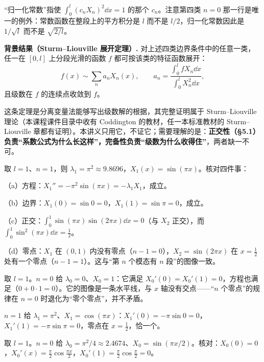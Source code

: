 \documentclass[11pt]{ctexart}
\let\orighdr\hdr
\renewcommand{\hdr}[2]{\needspace{12\baselineskip}\orighdr{#1}{#2}}
\let\origsubhdr\subhdr
\renewcommand{\subhdr}[1]{\needspace{3\baselineskip}\origsubhdr{#1}}
\begin{document}
“归一化常数”指使 $\int_0^l(c_nX_n)^2\dd x=1$ 的那个 $c_n$。注意第四类 $n=0$ 那一行是唯一的例外：常数函数在整段上的平方积分是 $l$ 而不是 $l/2$，归一化常数因此是 $1/\sqrt l$ 而不是 $\sqrt{2/l}$。


\textbf{背景结果（Sturm--Liouville 展开定理）.} 对上述四类边界条件中的任意一类，任一在 $[0,l]$ 上分段光滑的函数 $f$ 都可按该类的特征函数展开：
\[
f(x)\sim\sum_{n}a_nX_n(x),\qquad
a_n=\frac{\displaystyle\int_0^l fX_n\dd x}{\displaystyle\int_0^l X_n^2\dd x},
\]
且级数在 $f$ 的连续点收敛到 $f$。

这条定理是分离变量法能够写出级数解的根据，其完整证明属于 Sturm--Liouville 理论（本课程课件目录中收有 Coddington 的教材，任一本标准教材的 Sturm--Liouville 章都有证明）。本讲义只用它，不证它；需要理解的是：\textbf{正交性（§5.1）负责“系数公式为什么长这样”，完备性负责“级数为什么收得住”}，两者缺一不可。



取 $l=1$、$n=1$，则 $\lambda_1=\pi^2\approx9.8696$，$X_1(x)=\sin(\pi x)$。核对四件事：

（a）方程：$X_1''=-\pi^2\sin(\pi x)=-\lambda_1X_1$，成立。

（b）边界：$X_1(0)=\sin0=0$，$X_1(1)=\sin\pi=0$，成立。

（c）正交：$\displaystyle\int_0^1\sin(\pi x)\sin(2\pi x)\dd x=0$（与 $X_2$ 正交），而 $\displaystyle\int_0^1\sin^2(\pi x)\dd x=\frac12$。

（d）零点：$X_1$ 在 $(0,1)$ 内没有零点（$n-1=0$），$X_2=\sin(2\pi x)$ 在 $x=\frac12$ 处有一个零点（$n-1=1$）。这与“第 $n$ 个模态有 $n$ 段”的图像一致。


取 $l=1$。$n=0$ 给 $\lambda_0=0$、$X_0=1$：它满足 $X_0'(0)=X_0'(1)=0$，方程也满足（$0+0\cdot1=0$）。它的图像是一条水平线，与 $x$ 轴没有交点——“$n$ 个零点”的规律在 $n=0$ 时退化为“零个零点”，并不矛盾。

$n=1$ 给 $\lambda_1=\pi^2$、$X_1=\cos(\pi x)$：$X_1'(0)=-\pi\sin0=0$，$X_1'(1)=-\pi\sin\pi=0$，零点在 $x=\frac12$，恰一个。


取 $l=1$。$n=0$ 给 $\lambda_0=\pi^2/4\approx2.4674$、$X_0=\sin(\pi x/2)$。核对：$X_0(0)=0$，$X_0'(x)=\frac{\pi}{2}\cos\frac{\pi x}{2}$，$X_0'(1)=\frac{\pi}{2}\cos\frac{\pi}{2}=0$。
\end{document}
